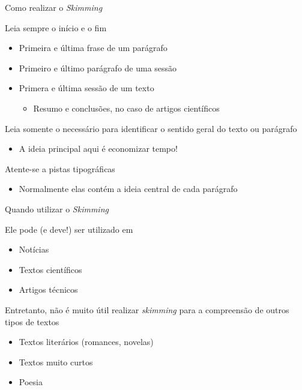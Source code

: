 \documentclass[compress,mathserif]{beamer}
\begin{document}
\begin{frame}{Como realizar o \textit{Skimming}}

Leia sempre o início e o fim
\begin{itemize}
    \item Primeira e última frase de um parágrafo
    \item Primeiro e último parágrafo de uma sessão
    \item Primera e última sessão de um texto
    \begin{itemize}
        \item Resumo e conclusões, no caso de artigos científicos
    \end{itemize}
\end{itemize}

Leia somente o necessário para identificar o sentido geral do texto ou parágrafo
\begin{itemize}
    \item A ideia principal aqui é economizar tempo!
\end{itemize}

Atente-se a pistas tipográficas
\begin{itemize}
    \item Normalmente elas contém a ideia central de cada parágrafo
\end{itemize}
\end{frame}


\begin{frame}{Quando utilizar o \textit{Skimming}}

Ele pode (e deve!) ser utilizado em
\begin{itemize}
    \item Notícias
    \item Textos científicos
    \item Artigos técnicos
\end{itemize}

\vspace{0.5cm}

Entretanto, não é muito útil realizar \textit{skimming} para a compreensão de outros tipos de textos
\begin{itemize}
    \item Textos literários (romances, novelas)
    \item Textos muito curtos
    \item Poesia
\end{itemize}

\end{frame}
\end{document}
